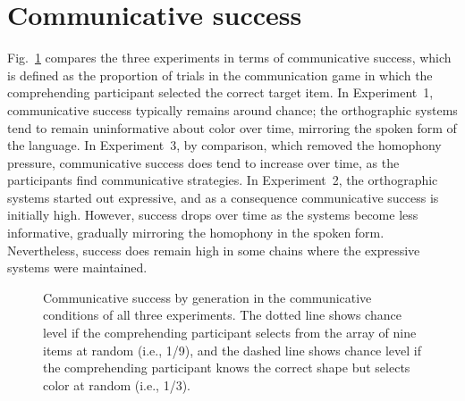 \documentclass[doc,biblatex]{apa7}
\begin{document}
\section{Communicative success}

Fig.~\ref{success} compares the three experiments in terms of communicative success, which is defined as the proportion of trials in the communication game in which the comprehending participant selected the correct target item. In Experiment~1, communicative success typically remains around chance; the orthographic systems tend to remain uninformative about color over time, mirroring the spoken form of the language. In Experiment~3, by comparison, which removed the homophony pressure, communicative success does tend to increase over time, as the participants find communicative strategies. In Experiment~2, the orthographic systems started out expressive, and as a consequence communicative success is initially high. However, success drops over time as the systems become less informative, gradually mirroring the homophony in the spoken form. Nevertheless, success does remain high in some chains where the expressive systems were maintained.

	\begin{figure}[h]
	\vspace*{2pt}
	\caption{Communicative success by generation in the communicative conditions of all three experiments. The dotted line shows chance level if the comprehending participant selects from the array of nine items at random (i.e., 1/9), and the dashed line shows chance level if the comprehending participant knows the correct shape but selects color at random (i.e., 1/3).}
	\label{success}
	\end{figure}
\end{document}
